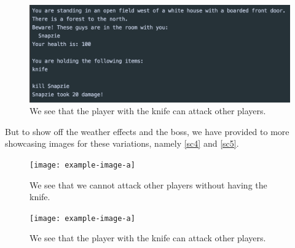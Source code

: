 \begin{figure}[H]
	\centering
	\includegraphics[width=0.8\linewidth]{Materials/Results/AttackingPlayer}
	\caption{We see that the player with the knife can attack other players.}
	\label{sc3}
\end{figure}

But to show off the weather effects and the boss, we have provided to more showcasing images for these variations, namely \autoref{sc4} and \autoref{sc5}.

\begin{figure}[H]
	\centering
	\texttt{[image: example-image-a]}
	\caption{We see that we cannot attack other players without having the knife.}
	\label{sc4}
\end{figure}

\begin{figure}[H]
	\centering
	\texttt{[image: example-image-a]}
	\caption{We see that the player with the knife can attack other players.}
	\label{sc5}
\end{figure}

